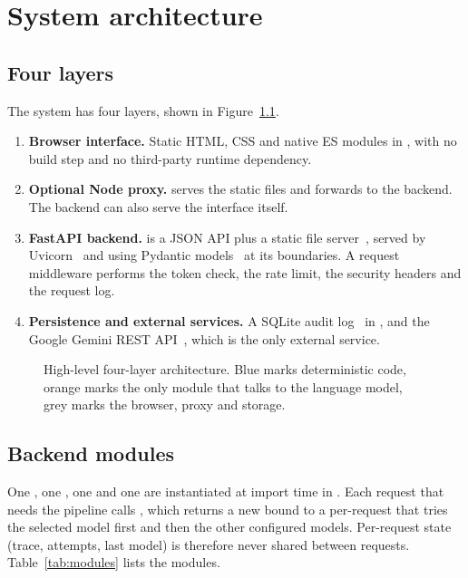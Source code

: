 \chapter{System architecture}\label{ch:arch}

\section{Four layers}
The system has four layers, shown in Figure~\ref{fig:arch}.
\begin{enumerate}
  \item \textbf{Browser interface.} Static HTML, CSS and native ES modules in , with no build step and no third-party runtime dependency.
  \item \textbf{Optional Node proxy.}  serves the static files and forwards  to the backend. The backend can also serve the interface itself.
  \item \textbf{FastAPI backend.}  is a JSON API plus a static file server~\cite{fastapi}, served by Uvicorn~\cite{uvicorn} and using Pydantic models~\cite{pydantic} at its boundaries. A request middleware performs the token check, the rate limit, the security headers and the request log.
  \item \textbf{Persistence and external services.} A SQLite audit log~\cite{sqlite} in , and the Google Gemini REST API~\cite{gemini}, which is the only external service.
\end{enumerate}

\begin{figure}[H]
\centering

\caption{High-level four-layer architecture. Blue marks deterministic code, orange marks the only module that talks to the language model, grey marks the browser, proxy and storage.}
\label{fig:arch}
\end{figure}

\section{Backend modules}
One , one , one  and one  are instantiated at import time in . Each request that needs the pipeline calls , which returns a new  bound to a per-request  that tries the selected model first and then the other configured models. Per-request state (trace, attempts, last model) is therefore never shared between requests. Table~\ref{tab:modules} lists the modules.


